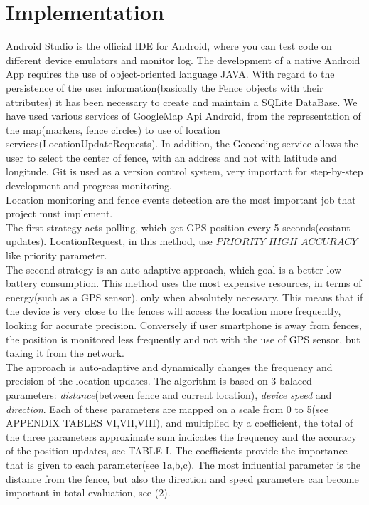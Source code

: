 \documentclass[conference]{IEEEtran}
\begin{document}
\section{Implementation}
Android Studio is the official IDE for Android, where you can test code on different device emulators and monitor log.
The development of a native Android App requires the use of object-oriented language JAVA.
With regard to the persistence of the user information(basically the Fence objects with their attributes) it has been necessary to create and maintain a SQLite DataBase.
We have used various services of GoogleMap Api Android, from the representation of the map(markers, fence circles) to use of location services(LocationUpdateRequests).
In addition, the Geocoding service allows the user to select the center of fence, with an address and not with latitude and longitude.
Git is used as a version control system, very important for step-by-step development and progress monitoring.\\
Location monitoring and fence events detection are the most important job that project must implement.\\
The first strategy acts polling, which get GPS position every 5 seconds(costant updates). LocationRequest, in this method, use $PRIORITY\_HIGH\_ACCURACY$ like priority parameter.\\
The second strategy is an auto-adaptive approach, which goal is a better low battery consumption.
This method uses the most expensive resources, in terms of energy(such as a GPS sensor), only when absolutely necessary. 
This means that if the device is very close to the fences will access the location more frequently, looking for accurate precision. 
Conversely if user smartphone is away from fences, the position is monitored less frequently and not with the use of GPS sensor, but taking it from the network.\\
The approach is auto-adaptive and dynamically changes the frequency and precision of the location updates.
The algorithm is based on 3 balaced parameters: \textit{distance}(between fence and current location), \textit{device speed} and \textit{direction}.
Each of these parameters are mapped on a scale from 0 to 5(see APPENDIX TABLES VI,VII,VIII), and multiplied by a coefficient, the total of the three parameters approximate sum indicates 
the frequency and the accuracy of the position updates, see TABLE I.
The coefficients provide the importance that is given to each parameter(see 1a,b,c).
The most influential parameter is the distance from the fence, but also the direction and speed parameters can become important in total evaluation, see (2).
\end{document}
